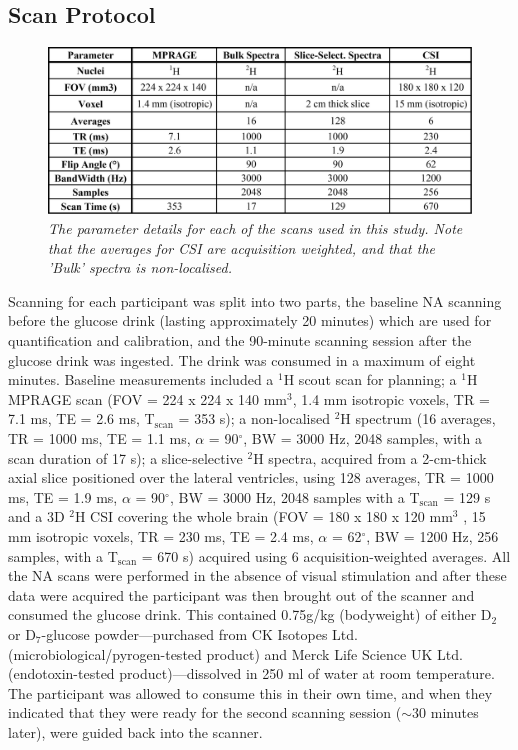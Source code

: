 \subsection{Scan Protocol}

\begin{figure}
    \centering
    \includegraphics[width = 1\textwidth]{Figures/Glucose/Scan_Details.png}
    \caption{\textit{The parameter details for each of the scans used in this study. Note that the averages for CSI are acquisition weighted, and that the 'Bulk' spectra is non-localised.}}
    \label{fig:Glu:Scan_Details}
\end{figure}

Scanning for each participant was split into two parts, the baseline \ac{NA} scanning before the glucose drink (lasting approximately 20 minutes) which are used for quantification and calibration, and the 90-minute scanning session after the glucose drink was ingested. The drink was consumed in a maximum of eight minutes. Baseline measurements included a $^1$H scout scan for planning; a $^1$H \ac{MPRAGE} scan (\ac{FOV} = 224 x 224 x 140 mm$^3$, 1.4 mm isotropic voxels, \ac{TR} = 7.1 ms, \ac{TE} = 2.6 ms, T$_\text{scan}$ = 353 s); a non-localised $^2$H spectrum (16 averages, \ac{TR} = 1000 ms, \ac{TE} = 1.1 ms, $\alpha$ = 90$^\circ$, \ac{BW} = 3000 Hz, 2048 samples, with a scan duration of 17 s); a slice-selective $^2$H spectra, acquired from a 2-cm-thick axial slice positioned over the lateral ventricles, using 128 averages, TR = 1000 ms, TE = 1.9 ms, $\alpha$ = 90$^\circ$, \ac{BW} = 3000 Hz,  2048 samples with a T$_\text{scan}$ = 129 s and a 3D $^2$H \ac{CSI} covering the whole brain (\ac{FOV} = 180 x 180 x 120 mm$^3$ , 15 mm isotropic voxels, \ac{TR} = 230 ms, \ac{TE} = 2.4 ms, $\alpha$ = 62$^\circ$, \ac{BW} = 1200 Hz, 256 samples, with a T$_\text{scan}$ = 670 s) acquired using 6 acquisition-weighted \cite{Pohmann2001AccurateCSI} averages. All the \ac{NA} scans were performed in the absence of visual stimulation and after these data were acquired the participant was then brought out of the scanner and consumed the glucose drink. This contained 0.75g/kg (bodyweight) of either D$_2$ or D$_7$-glucose powder—purchased from CK Isotopes Ltd. (microbiological/pyrogen-tested product) and Merck Life Science UK Ltd. (endotoxin-tested product)—dissolved in 250 ml of water at room temperature. The participant was allowed to consume this in their own time, and when they indicated that they were ready for the second scanning session ($\sim$30 minutes later), were guided back into the scanner.

